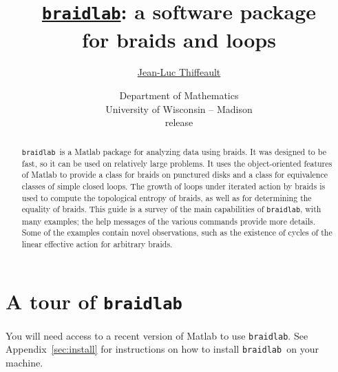 \documentclass[12pt]{article}
\newcommand{\braidlab}{\texttt{braidlab}}%
\begin{document}
\lstset{language=Matlab}
\lstset{breaklines=true}

\lstset{%
basicstyle=\small\ttfamily,
keywordstyle=\small\ttfamily,
identifierstyle=,
commentstyle=\small\rmfamily\itshape,%
stringstyle=\small\ttfamily,
showstringspaces=false}


\title{\href{{https://bitbucket.org/jeanluc/braidlab}}{\braidlab}:
  a software package \\ for braids and loops}
\author{\href{http://www.math.wisc.edu/~jeanluc}{Jean-Luc Thiffeault}}
\date{{\small Department of Mathematics\\ University of
    Wisconsin -- Madison} \\[10pt]
  release } %

\maketitle

\begin{abstract}
  \braidlab\ is a Matlab package for analyzing data using braids.  It was
  designed to be fast, so it can be used on relatively large problems.  It
  uses the object-oriented features of Matlab to provide a class for braids on
  punctured disks and a class for equivalence classes of simple closed loops.
  The growth of loops under iterated action by braids is used to compute the
  topological entropy of braids, as well as for determining the equality of
  braids.  This guide is a survey of the main capabilities of \braidlab, with
  many examples; the help messages of the various commands provide more
  details.  Some of the examples contain novel observations, such as the
  existence of cycles of the linear effective action for arbitrary braids.
\end{abstract}

\tableofcontents


\section{A tour of \braidlab}
\label{sec:tour}

You will need access to a recent version of Matlab to use \braidlab.  See
Appendix~\ref{sec:install} for instructions on how to install \braidlab\ on
your machine.
\end{document}
